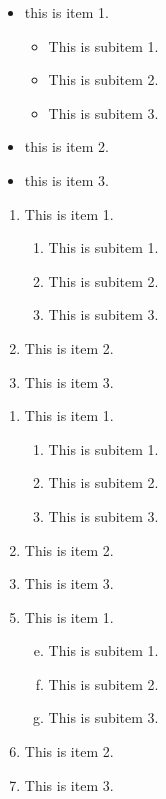 \documentclass{book} %
\begin{document}
\begin{itemize}			%
  \item this is item 1.
  \begin{itemize}       %
    \item This is subitem 1. %
    \item This is subitem 2.
    \item This is subitem 3.
  \end{itemize}
  \item this is item 2.
  \item this is item 3.
\end{itemize}

\begin{enumerate}       %
	\item This is item 1.		%
	\begin{enumerate}       %
		\item This is subitem 1.
		\item This is subitem 2.
		\item This is subitem 3.
	\end{enumerate}
	\item This is item 2.
	\item This is item 3.
\end{enumerate}

\begin{enumerate} [A]      %
  \item This is item 1.		%
    \begin{enumerate}       %
    \item This is subitem 1.
    \item This is subitem 2.
    \item This is subitem 3.
  \end{enumerate}
  \item This is item 2.
  \item This is item 3.
\end{enumerate}
\begin{enumerate} [\bfseries A.]      %
\setcounter {enumi}{4}  %
  \item This is item 1.
  \begin{enumerate}[a.] 
  \setcounter {enumii}{4}   %
    \item This is subitem 1.
    \item This is subitem 2.
    \item This is subitem 3.
  \end{enumerate}
  \item This is item 2.
  \item This is item 3.
\end{enumerate}
\end{document}
